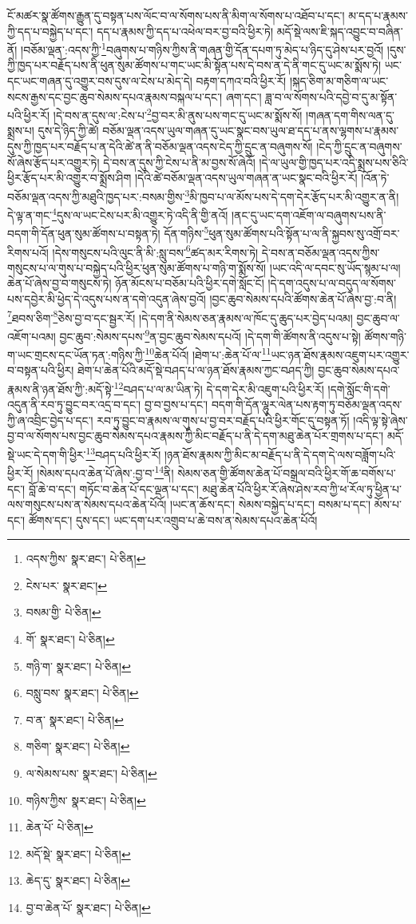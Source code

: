ངོ་མཚར་སྣ་ཚོགས་རྒྱུན་དུ་བསྟན་པས་ལོང་བ་ལ་སོགས་པས་ནི་མིག་ལ་སོགས་པ་འཐོབ་པ་དང་། མ་དད་པ་རྣམས་ཀྱི་དད་པ་བསྐྱེད་པ་དང་། དད་པ་རྣམས་ཀྱི་དད་པ་འཕེལ་བར་བྱ་བའི་ཕྱིར་ཏེ། མདོ་སྡེ་ལས་ཇི་སྐད་འབྱུང་བ་བཞིན་ནོ། །བཅོམ་ལྡན་:འདས་ཀྱི་\footnote{འདས་ཀྱིས་  སྣར་ཐང་།  པེ་ཅིན། }བཞུགས་པ་གཉིས་ཀྱིས་ནི་གཞན་གྱི་དོན་དཔག་ཏུ་མེད་པ་ཉིད་དུ་ཤེས་པར་བྱའོ། །དུས་ཀྱི་ཁྱད་པར་བརྗོད་པས་ནི་ཕུན་སུམ་ཚོགས་པ་གང་ཡང་མི་སྟོན་པས་དེ་བས་ན་དེ་ནི་གང་དུ་ཡང་མ་སྨོས་ཏེ། ཡང་དང་ཡང་གཞན་དུ་འགྱུར་བས་དུས་ལ་ངེས་པ་མེད་དེ། བརྟག་དཀའ་བའི་ཕྱིར་རོ། །སྐད་ཅིག་མ་གཅིག་ལ་ཡང་སངས་རྒྱས་དང་བྱང་ཆུབ་སེམས་དཔའ་རྣམས་བསྐལ་པ་དང་། ཞག་དང་། ཟླ་བ་ལ་སོགས་པའི་དབྱེ་བ་དུ་མ་སྟོན་པའི་ཕྱིར་རོ། །དེ་བས་ན་དུས་ལ་:ངེས་པ་\footnote{ངེས་པར་  སྣར་ཐང་། }བྱ་བར་མི་ནུས་པས་གང་དུ་ཡང་མ་སྨོས་སོ། །གཞན་དག་གིས་ལན་དུ་སྨྲས་པ། དུས་དེ་ཉིད་ཀྱི་ཚེ། བཅོམ་ལྡན་འདས་ཡུལ་གཞན་དུ་ཡང་སྣང་བས་ཡུལ་ཐ་དད་པ་ནས་ལྷགས་པ་རྣམས་དུས་ཀྱི་ཁྱད་པར་བརྗོད་པ་ན་དེའི་ཚེ་ན་ནི་བཅོམ་ལྡན་འདས་ངེད་ཀྱི་དྲུང་ན་བཞུགས་སོ། །ངེད་ཀྱི་དྲུང་ན་བཞུགས་སོ་ཞེས་རྩོད་པར་འགྱུར་ཏེ། དེ་བས་ན་དུས་ཀྱི་ངེས་པ་ནི་མ་བྱས་སོ་ཞེའོ། །དེ་ལ་ཡུལ་གྱི་ཁྱད་པར་འདི་སྨྲས་པས་ཅིའི་ཕྱིར་རྩོད་པར་མི་འགྱུར་བ་སྨྲོས་ཤིག །དེའི་ཚེ་བཅོམ་ལྡན་འདས་ཡུལ་གཞན་ན་ཡང་སྣང་བའི་ཕྱིར་རོ། །འོན་ཏེ་བཅོམ་ལྡན་འདས་ཀྱི་མཐུའི་ཁྱད་པར་:བསམ་གྱིས་\footnote{བསམ་གྱི་  པེ་ཅིན། }མི་ཁྱབ་པ་ལ་མོས་པས་དེ་དག་དེར་རྩོད་པར་མི་འགྱུར་ན་ནི། དེ་ལྟ་ན་གང་\footnote{གོ་  སྣར་ཐང་།  པེ་ཅིན། }དུས་ལ་ཡང་ངེས་པར་མི་འགྱུར་ཏེ་འདི་ནི་གྱི་ནའོ། །ནང་དུ་ཡང་དག་འཇོག་ལ་བཞུགས་པས་ནི་བདག་གི་དོན་ཕུན་སུམ་ཚོགས་པ་བསྟན་ཏེ། དོན་གཉིས་\footnote{གཉི་ག་  སྣར་ཐང་།  པེ་ཅིན། }ཕུན་སུམ་ཚོགས་པའི་སྟོན་པ་ལ་ནི་སྐྱབས་སུ་འགྲོ་བར་རིགས་པའོ། །དེས་གསུངས་པའི་ལུང་ནི་མི་:སླུ་བས་\footnote{བསླུ་བས་  སྣར་ཐང་།  པེ་ཅིན། }ཚད་མར་རིགས་ཏེ། དེ་བས་ན་བཅོམ་ལྡན་འདས་ཀྱིས་གསུངས་པ་ལ་གུས་པ་བསྐྱེད་པའི་ཕྱིར་ཕུན་སུམ་ཚོགས་པ་གཉི་ག་སྨོས་སོ། །ཡང་འདི་ལ་དབང་སུ་ཡོད་སྙམ་པ་ལ། ཆེན་པོ་ཞེས་བྱ་བ་གསུངས་ཏེ། ཉོན་མོངས་པ་བཅོམ་པའི་ཕྱིར་དགེ་སློང་ངོ། །དེ་དག་འདུས་པ་ལ་བདུད་ལ་སོགས་པས་དབྱེར་མི་ཕྱེད་དེ་འདུས་པས་ན་དགེ་འདུན་ཞེས་བྱའོ། །བྱང་ཆུབ་སེམས་དཔའི་ཚོགས་ཆེན་པོ་ཞེས་བྱ་:བ་ནི། \footnote{བ་ན་  སྣར་ཐང་།  པེ་ཅིན། }ཐབས་ཅིག་\footnote{གཅིག་  སྣར་ཐང་།  པེ་ཅིན། }ཅེས་བྱ་བ་དང་སྦྱར་རོ། །དེ་དག་ནི་སེམས་ཅན་རྣམས་ལ་ཁོང་དུ་ཆུད་པར་བྱེད་པའམ། བྱང་ཆུབ་ལ་འཇོག་པའམ། བྱང་ཆུབ་:སེམས་དཔས་\footnote{ལ་སེམས་པས་  སྣར་ཐང་།  པེ་ཅིན། }ན་བྱང་ཆུབ་སེམས་དཔའོ། །དེ་དག་གི་ཚོགས་ནི་འདུས་པ་སྟེ། ཚོགས་གཉི་ག་ཡང་གྲངས་དང་ཡོན་ཏན་:གཉིས་ཀྱི་\footnote{གཉིས་ཀྱིས་  སྣར་ཐང་།  པེ་ཅིན། }ཆེན་པོའོ། །ཐེག་པ་:ཆེན་པོ་ལ་\footnote{ཆེན་པོ་  པེ་ཅིན། }ཡང་ཉན་ཐོས་རྣམས་འཇུག་པར་འགྱུར་བ་བསྟན་པའི་ཕྱིར། ཐེག་པ་ཆེན་པོའི་མདོ་སྡེ་བཤད་པ་ལ་ཉན་ཐོས་རྣམས་ཀྱང་བཤད་ཀྱི། བྱང་ཆུབ་སེམས་དཔའ་རྣམས་ནི་ཉན་ཐོས་ཀྱི་:མདོ་སྟེ་\footnote{མདོ་སྡེ་  སྣར་ཐང་།  པེ་ཅིན། }བཤད་པ་ལ་མ་ཡིན་ཏེ། དེ་དག་དེར་མི་འཇུག་པའི་ཕྱིར་རོ། །དགེ་སློང་གི་དགེ་འདུན་ནི་རབ་ཏུ་བྱུང་བར་འདྲ་བ་དང་། བྱ་བ་བྱས་པ་དང་། བདག་གི་དོན་ལྷུར་ལེན་པས་རྟག་ཏུ་བཅོམ་ལྡན་འདས་ཀྱི་ཞ་འབྲིང་བྱེད་པ་དང་། རབ་ཏུ་བྱུང་བ་རྣམས་ལ་གུས་པ་བྱ་བར་བརྗོད་པའི་ཕྱིར་གོང་དུ་བསྟན་ཏོ། །འདི་ལྟ་སྟེ་ཞེས་བྱ་བ་ལ་སོགས་པས་བྱང་ཆུབ་སེམས་དཔའ་རྣམས་ཀྱི་མིང་བརྗོད་པ་ནི་དེ་དག་མཐུ་ཆེན་པོར་གྲགས་པ་དང་། མདོ་སྡེ་ཡང་དེ་དག་གི་ཕྱིར་\footnote{ཆེད་དུ་  སྣར་ཐང་།  པེ་ཅིན། }བཤད་པའི་ཕྱིར་རོ། །ཉན་ཐོས་རྣམས་ཀྱི་མིང་མ་བརྗོད་པ་ནི་དེ་དག་དེ་ལས་བཟློག་པའི་ཕྱིར་རོ། །སེམས་དཔའ་ཆེན་པོ་ཞེས་:བྱ་བ་\footnote{བྱ་བ་ཆེན་པོ་  སྣར་ཐང་།  པེ་ཅིན། }ནི། སེམས་ཅན་གྱི་ཚོགས་ཆེན་པོ་བསྒྲལ་བའི་ཕྱིར་གོ་ཆ་བགོས་པ་དང་། བློ་ཆེ་བ་དང་། གཏོང་བ་ཆེན་པོ་དང་ལྡན་པ་དང་། མཐུ་ཆེན་པོའི་ཕྱིར་རོ་ཞེས་ཤེས་རབ་ཀྱི་ཕ་རོལ་ཏུ་ཕྱིན་པ་ལས་གསུངས་པས་ན་སེམས་དཔའ་ཆེན་པོའོ། །ཡང་ན་ཆོས་དང་། སེམས་བསྐྱེད་པ་དང་། བསམ་པ་དང་། མོས་པ་དང་། ཚོགས་དང་། དུས་དང་། ཡང་དག་པར་འགྲུབ་པ་ཆེ་བས་ན་སེམས་དཔའ་ཆེན་པོའོ། 